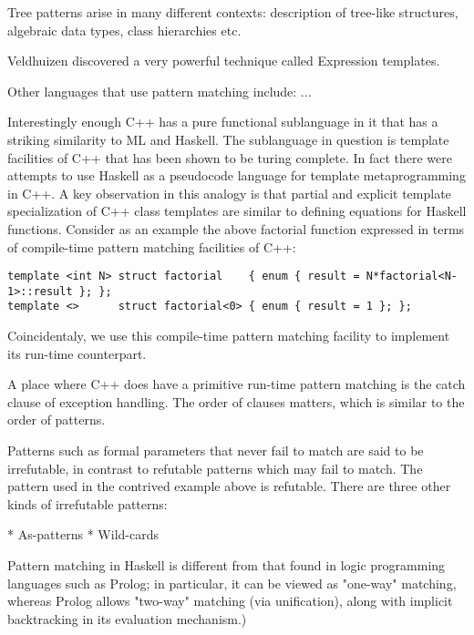 \documentclass[preprint]{sigplanconf}
\begin{document}
Tree patterns arise in many different contexts: description of tree-like 
structures, algebraic data types, class hierarchies etc.

Veldhuizen discovered a very powerful technique called Expression 
templates\cite{Veldhuizen95expressiontemplates}.


Other languages that use pattern matching include: ...

Interestingly enough C++ has a pure functional sublanguage in it that has a 
striking similarity to ML and Haskell. The sublanguage in question is template 
facilities of C++ that has been shown to be turing 
complete\cite{veldhuizen:templates_turing_complete}. In fact there were 
attempts to use Haskell as a pseudocode language for template metaprogramming in 
C++\cite{Milewski11}. A key observation in this analogy is that partial and 
explicit template specialization of C++ class templates are similar to defining 
equations for Haskell functions. Consider as an example the above factorial 
function expressed in terms of compile-time pattern matching facilities of C++:

\begin{lstlisting}
template <int N> struct factorial    { enum { result = N*factorial<N-1>::result }; };
template <>      struct factorial<0> { enum { result = 1 }; };
\end{lstlisting}

Coincidentaly, we use this compile-time pattern matching facility to implement 
its run-time counterpart.

A place where C++ does have a primitive run-time pattern matching is the catch 
clause of exception handling. The order of clauses matters, which is similar to 
the order of patterns. 

Patterns such as formal parameters that never fail to match are said to be 
irrefutable, in contrast to refutable patterns which may fail to match. The 
pattern used in the contrived example above is refutable. There are three other 
kinds of irrefutable patterns:

* As-patterns
* Wild-cards 

Pattern matching in Haskell is different from that found in logic programming 
languages such as Prolog; in particular, it can be viewed as "one-way" matching, 
whereas Prolog allows "two-way" matching (via unification), along with implicit 
backtracking in its evaluation mechanism.) 
\end{document}
